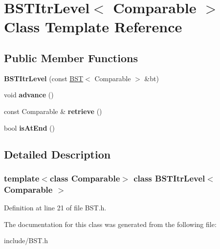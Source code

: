\hypertarget{classBSTItrLevel}{}\section{B\+S\+T\+Itr\+Level$<$ Comparable $>$ Class Template Reference}
\label{classBSTItrLevel}
\subsection*{Public Member Functions}
\begin{DoxyCompactItemize}
\item 
\mbox{\label{classBSTItrLevel_a8fd5cdde93eb182c4cd5cf6b2c5efaeb}} 
{\bfseries B\+S\+T\+Itr\+Level} (const \hyperlink{classBST}{B\+ST}$<$ Comparable $>$ \&bt)
\item 
\mbox{\label{classBSTItrLevel_ad54a6fa289a59d6050b507abe40d463b}} 
void {\bfseries advance} ()
\item 
\mbox{\label{classBSTItrLevel_a7932a172129cc6ca14b6efeee1b4dd87}} 
const Comparable \& {\bfseries retrieve} ()
\item 
\mbox{\label{classBSTItrLevel_a89bc8e81dde255fd6bad917cacc0d489}} 
bool {\bfseries is\+At\+End} ()
\end{DoxyCompactItemize}


\subsection{Detailed Description}
\subsubsection*{template$<$class Comparable$>$\newline
class B\+S\+T\+Itr\+Level$<$ Comparable $>$}



Definition at line 21 of file B\+S\+T.\+h.



The documentation for this class was generated from the following file\+:\begin{DoxyCompactItemize}
\item 
include/B\+S\+T.\+h\end{DoxyCompactItemize}
